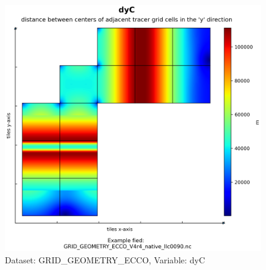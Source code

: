 \begin{figure}[H]
\centering
\includegraphics[scale=0.55]{../images/plots/native_plots_coords/Geometry_Parameters_for_the_Lat-Lon-Cap_90_(llc90)_Native_Model_Grid_(Version_4_Release_4)/dyC.png}
\caption{Dataset: GRID\_GEOMETRY\_ECCO, Variable: dyC}
\label{tab:table-GRID_GEOMETRY_ECCO_dyC-Plot}
\end{figure}
\pagebreak
